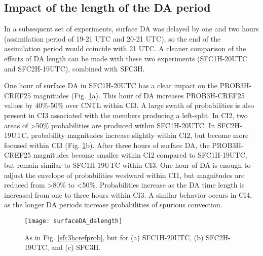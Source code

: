 \subsection{Impact of the length of the DA period}
In a subsequent set of experiments, surface DA was delayed by one and two hours (assimilation period of 19-21 UTC and 20-21 UTC), so the end of the assimilation period would coincide with 21 UTC. A cleaner comparison of the effects of DA length can be made with these two experiments (SFC1H-20UTC and SFC2H-19UTC), combined with SFC3H.

One hour of surface DA in SFC1H-20UTC has a clear impact on the PROB3H-CREF25 magnitudes (Fig. \ref{sfc3hdalength}a). This hour of DA increases PROB3H-CREF25 values by 40\%-50\% over CNTL within CI3. A large swath of probabilities is also present in CI3 associated with the members producing a left-split. In CI2, two areas of \textgreater 50\% probabilities are produced within SFC1H-20UTC. In SFC2H-19UTC, probability magnitudes increase slightly within CI2, but become more focused within CI3 (Fig. \ref{sfc3hdalength}b). After three hours of surface DA, the PROB3H-CREF25 magnitudes become smaller within CI2 compared to SFC1H-19UTC, but remain similar to SFC1H-19UTC within CI3. One hour of DA is enough to adjust the envelope of probabilities westward within CI1, but magnitudes are reduced from \textgreater 80\% to  \textless 50\%. Probabilities increase as the DA time length is increased from one to three hours within CI3. A similar behavior occurs in CI4, as the longer DA periods increase probabilities of spurious convection.

\begin{figure}
\centering
\texttt{[image: surfaceDA\_dalength]}
\caption{As in Fig. \ref{sfc3hcrefprob}, but for (a) SFC1H-20UTC, (b) SFC2H-19UTC, and (c) SFC3H.}
\label{sfc3hdalength}
\end{figure}

